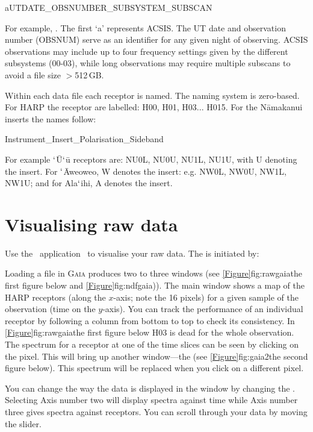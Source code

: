 \documentclass[11pt,oneside,chapters]{starlink}
\begin{document}
aUTDATE\_OBSNUMBER\_SUBSYSTEM\_SUBSCAN

For example, . The first `a' represents
ACSIS. The UT date and observation number (OBSNUM) serve as an
identifier for any given night of observing. ACSIS observations may
include up to four frequency settings given by the different
subsystems (00-03), while long observations may require multiple
subscans to avoid a file size $>$512\,GB.

Within each data file each receptor is named. The naming system is
zero-based. For HARP the receptor are labelled: H00, H01, H03... H015.
For the N\=amakanui inserts the names follow:

Instrument\_Insert\_Polarisation\_Sideband

For example $`$\=U$`$\=u receptors are: NU0L, NU0U, NU1L, NU1U,
with U denoting the insert. For $`$\=Aweoweo, W denotes the insert:
e.g. NW0L, NW0U, NW1L, NW1U; and for Ala$`$ihi, A denotes the insert.

\section{Visualising raw data}
\label{sec:exam}

Use the \starlink\ application \gaia\ to visualise your raw data. The
is initiated by:

\begin{terminalv}
\end{terminalv}

Loading a file in \textsc{Gaia} produces two to three windows (see
\cref{Figure}{fig:rawgaia}{the first figure below} and
\cref{Figure}{fig:ndfgaia})). The main window
shows a map of the HARP receptors (along the $x$-axis; note the 16
pixels) for a given sample of the observation (time on the $y$-axis).
You can track the performance of an individual receptor by following a
column from bottom to top to check its consistency. In
\cref{Figure}{fig:rawgaia}{the first figure below} H03 is dead for the
whole observation. The spectrum for a receptor at one of the time
slices can be seen by clicking on the pixel. This will bring up
another window---the  (see
\cref{Figure}{fig:gaia2}{the second figure below}). This spectrum will
be replaced when you click on a different pixel.

You can change the way the data is displayed in the  window by changing the .
Selecting Axis number two will display spectra against time while Axis
number three gives spectra against receptors. You can scroll through
your data by moving the  slider.
\end{document}
